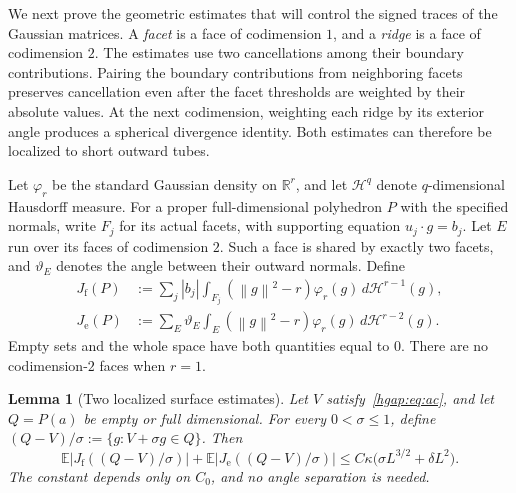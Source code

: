 \documentclass[11pt,letterpaper]{article}
\newtheorem{lemma}{Lemma}
\theoremstyle{remark}
\newcommand{\E}{\mathbb E}
\newcommand{\R}{\mathbb R}
\newcommand{\norm}[1]{\left\lVert#1\right\rVert}
\newcommand{\dd}{\,d}
\begin{document}
We next prove the geometric estimates that will control the signed
traces of the Gaussian matrices. A \emph{facet} is a face of codimension
$1$, and a \emph{ridge} is a face of codimension $2$. The estimates use
two cancellations among their boundary contributions.
Pairing the boundary contributions from neighboring facets preserves
cancellation even after the facet thresholds are weighted by their
absolute values. At the next codimension, weighting
each ridge by its exterior angle produces a spherical divergence identity.
Both estimates can therefore be localized to short outward tubes.

Let $\varphi_r$ be the standard Gaussian density on $\R^r$, and let
$\mathcal H^q$ denote $q$-dimensional Hausdorff measure.
For a proper full-dimensional polyhedron $P$ with the specified normals,
write $F_j$ for its actual facets, with supporting equation
$u_j\cdot g=b_j$. Let $E$ run over its faces of codimension $2$.
Such a face is shared by exactly two facets, and $\vartheta_E$ denotes
the angle between their outward normals. Define
\begin{align}
 J_{\mathrm f}(P)&:=\sum_j |b_j|
   \int_{F_j}(\norm g^2-r)\varphi_r(g)\dd\mathcal H^{r-1}(g),
 \label{hgap:eq:Jf}\\
 J_{\mathrm e}(P)&:=\sum_E \vartheta_E
   \int_E(\norm g^2-r)\varphi_r(g)\dd\mathcal H^{r-2}(g).
 \label{hgap:eq:Je}
\end{align}
Empty sets and the whole space have both quantities equal to $0$.
There are no codimension-$2$ faces when $r=1$.

\begin{lemma}[Two localized surface estimates]\label{hgap:lem:surfaces}
Let $V$ satisfy~\eqref{hgap:eq:ac}, and let $Q=P(a)$ be empty or full
dimensional. For every $0<\sigma\le1$, define
$(Q-V)/\sigma:=\{g:V+\sigma g\in Q\}$. Then
\begin{equation}
 \E\bigl|J_{\mathrm f}((Q-V)/\sigma)\bigr|
 +\E\bigl|J_{\mathrm e}((Q-V)/\sigma)\bigr|
 \le C\kappa\bigl(\sigma L^{3/2}+\delta L^2\bigr).
 \label{hgap:eq:surface-bounds}
\end{equation}
The constant depends only on $C_0$, and no angle separation is needed.
\end{lemma}
\end{document}
